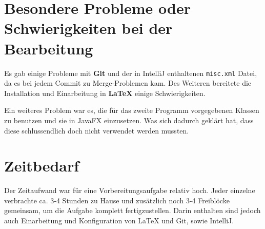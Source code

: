 \documentclass[a4paper,parskip=half,11pt]{scrartcl}
\begin{document}
\section*{Besondere Probleme oder Schwierigkeiten bei der Bearbeitung}
Es gab einige Probleme mit \textbf{Git} und der in IntelliJ enthaltenen \texttt{\small misc.xml} Datei, da es bei jedem Commit zu Merge-Problemen kam. 
Des Weiteren bereitete die Installation und Einarbeitung in \textbf{\LaTeX{}} einige Schwierigkeiten. 

Ein weiteres Problem war es, die für das zweite Programm vorgegebenen Klassen zu benutzen und sie in JavaFX einzusetzen. Was sich dadurch geklärt hat, dass diese schlussendlich doch nicht verwendet werden mussten.

\section*{Zeitbedarf}
Der Zeitaufwand war für eine Vorbereitungsaufgabe relativ hoch. Jeder einzelne verbrachte ca. 3-4 Stunden zu Hause und zusätzlich noch 3-4 Freiblöcke gemeinsam, um die Aufgabe komplett fertigzustellen. 
Darin enthalten sind jedoch auch Einarbeitung und Konfiguration von \LaTeX{} und Git, sowie IntelliJ.
\end{document}
